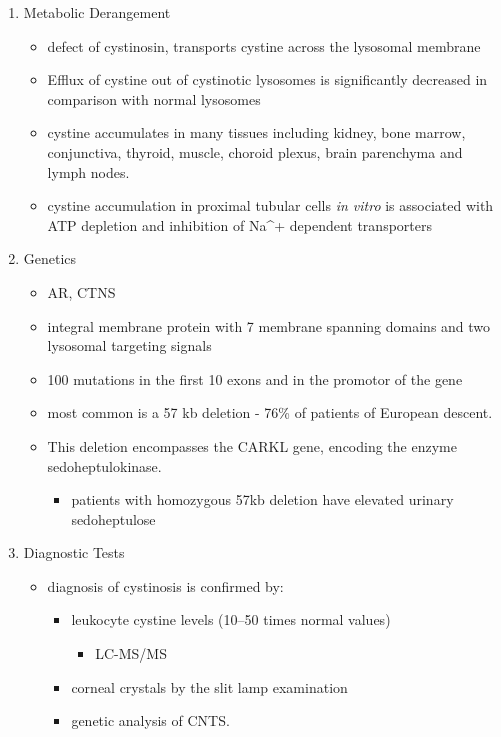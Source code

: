 \documentclass{scrartcl}
\begin{document}
\begin{enumerate}
\item Metabolic Derangement
\label{sec:orga42ae09}
\begin{itemize}
\item defect of cystinosin, transports cystine across the lysosomal
membrane
\item Efflux of cystine out of cystinotic lysosomes is significantly
decreased in comparison with normal lysosomes
\item cystine accumulates in many tissues including kidney, bone marrow,
conjunctiva, thyroid, muscle, choroid plexus, brain parenchyma and
lymph nodes.
\item cystine accumulation in proximal tubular cells \emph{in vitro} is
associated with ATP depletion and inhibition of Na\^{}+ dependent
transporters
\end{itemize}

\item Genetics
\label{sec:orgbb695e2}
\begin{itemize}
\item AR, CTNS
\item integral membrane protein with 7 membrane spanning domains and two
lysosomal targeting signals
\item 100 mutations in the first 10 exons and in the promotor of the gene
\item most common is a 57 kb deletion - 76\% of patients of European descent.
\item This deletion encompasses the CARKL gene, encoding the enzyme sedoheptulokinase.
\begin{itemize}
\item patients with homozygous 57kb deletion have elevated urinary sedoheptulose
\end{itemize}
\end{itemize}

\item Diagnostic Tests
\label{sec:orgc4e2efb}

\begin{itemize}
\item diagnosis of cystinosis is confirmed by:
\begin{itemize}
\item leukocyte cystine levels (10–50 times normal values)
\begin{itemize}
\item LC-MS/MS
\end{itemize}
\item corneal crystals by the slit lamp examination
\item genetic analysis of CNTS.
\end{itemize}
\end{itemize}


\end{enumerate}
\end{document}
